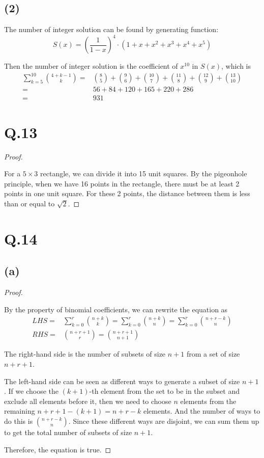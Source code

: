 \documentclass[a4paper,12pt]{article}
\begin{document}
\subsection*{(2)}

The number of integer solution can be found by generating function:
\begin{equation*}
	S(x) = \left(\frac{1}{1-x}\right)^4 \cdot (1 + x + x^2 + x^3 + x^4 + x^5)
\end{equation*}

Then the number of integer solution is the coefficient of $x^{10}$ in $S(x)$, which is
\begin{align*}
	\sum_{k = 5}^{10} \binom{4 + k - 1}{k} =& \binom{8}{5} + \binom{9}{6} + \binom{10}{7} + \binom{11}{8} + \binom{12}{9} + \binom{13}{10} \\
	=& 56 + 84 + 120 + 165 + 220 + 286 \\
	=& 931
\end{align*}
\section*{Q.13}

\begin{proof}
$ $

For a $5 \times 3$ rectangle, we can divide it into 15 unit squares.
By the pigeonhole principle, when we have 16 points in the rectangle, there must be at least 2 points in one unit square.
For these 2 points, the distance between them is less than or equal to $\sqrt{2}$.
\end{proof}

\section*{Q.14}

\subsection*{(a)}

\begin{proof}
$ $

By the property of binomial coefficients, we can rewrite the equation as
\begin{align*}
	LHS =& \sum_{k = 0}^r \binom{n + k}{k} = \sum_{k = 0}^r \binom{n + k}{n} = \sum_{k = 0}^r \binom{n + r - k}{n} \\
	RHS =& \binom{n + r + 1}{r} = \binom{n + r + 1}{n + 1}
\end{align*}

The right-hand side is the number of subsets of size $n + 1$ from a set of size $n + r + 1$.

The left-hand side can be seen as different ways to generate a subset of size $n + 1$.
If we choose the $(k + 1)$-th element from the set to be in the subset and exclude all elements before it, then we need to choose $n$ elements from the remaining $n + r + 1 - (k + 1) = n + r - k$ elements.
And the number of ways to do this is $\binom{n + r - k}{n}$.
Since these different ways are disjoint, we can sum them up to get the total number of subsets of size $n + 1$.

Therefore, the equation is true.
\end{proof}
\end{document}
